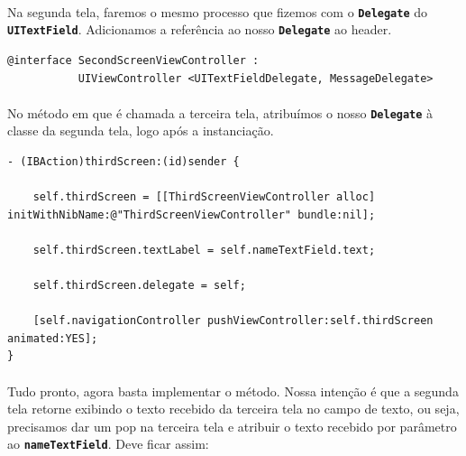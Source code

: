 \documentclass[a4paper,12pt,brazil,doubleside]{book}
\begin{document}
\paragraph{}Na segunda tela, faremos o mesmo processo que fizemos com o \texttt{\textbf{Delegate}} do \texttt{\textbf{UITextField}}. Adicionamos a referência ao nosso \texttt{\textbf{Delegate}} ao header.\\

\begin{listing}
\begin{verbatim}
@interface SecondScreenViewController :
           UIViewController <UITextFieldDelegate, MessageDelegate>
\end{verbatim}
\end{listing}

\paragraph{}No método em que é chamada a terceira tela, atribuímos o nosso \texttt{\textbf{Delegate}} à classe da segunda tela, logo após a instanciação.

\begin{listing}
\begin{verbatim}
- (IBAction)thirdScreen:(id)sender {
    
    self.thirdScreen = [[ThirdScreenViewController alloc] initWithNibName:@"ThirdScreenViewController" bundle:nil];
    
    self.thirdScreen.textLabel = self.nameTextField.text;
    
    self.thirdScreen.delegate = self;
    
    [self.navigationController pushViewController:self.thirdScreen animated:YES];
}
\end{verbatim}
\end{listing}

\paragraph{}Tudo pronto, agora basta implementar o método. Nossa intenção é que a segunda tela retorne exibindo o texto recebido da terceira tela no campo de texto, ou seja, precisamos dar um pop na terceira tela e atribuir o texto recebido por parâmetro ao \texttt{\textbf{nameTextField}}. Deve ficar assim:
\end{document}

